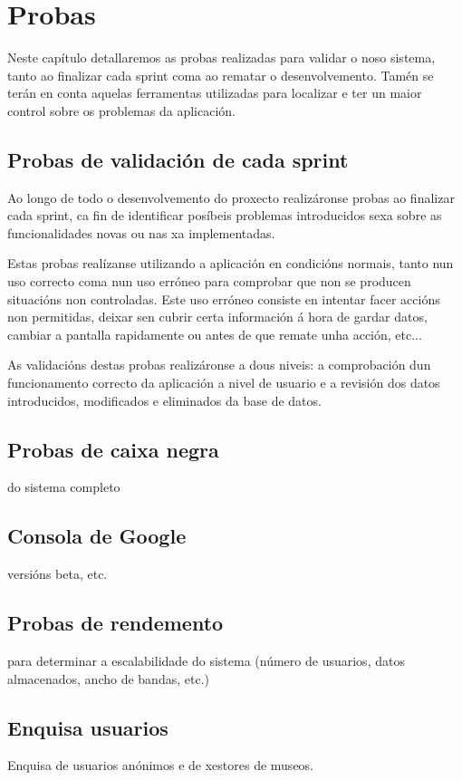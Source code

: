 \chapter{Probas}

Neste capítulo detallaremos as probas realizadas para validar o noso sistema, tanto ao finalizar cada sprint coma ao rematar o desenvolvemento. Tamén se terán en conta aquelas ferramentas utilizadas para localizar e ter un maior control sobre os problemas da aplicación.



\section{Probas de validación de cada sprint}
Ao longo de todo o desenvolvemento do proxecto realizáronse probas ao finalizar cada sprint, ca fin de identificar posíbeis problemas introducidos sexa sobre as funcionalidades novas ou nas xa implementadas.

Estas probas realízanse utilizando a aplicación en condicións normais, tanto nun uso correcto coma nun uso erróneo para comprobar que non se producen situacións non controladas. Este uso erróneo consiste en intentar facer accións non permitidas, deixar sen cubrir certa información á hora de gardar datos, cambiar a pantalla rapidamente ou antes de que remate unha acción, etc...

As validacións destas probas realizáronse a dous niveis: a comprobación dun funcionamento correcto da aplicación a nivel de usuario e a revisión dos datos introducidos, modificados e eliminados da base de datos.

\section{Probas de caixa negra}

do sistema completo


\section{Consola de Google}

versións beta, etc.

\section{Probas de rendemento}

para determinar a escalabilidade do sistema (número de usuarios, datos almacenados, ancho de bandas, etc.)


\section{Enquisa usuarios}

Enquisa de usuarios anónimos e de xestores de museos.
